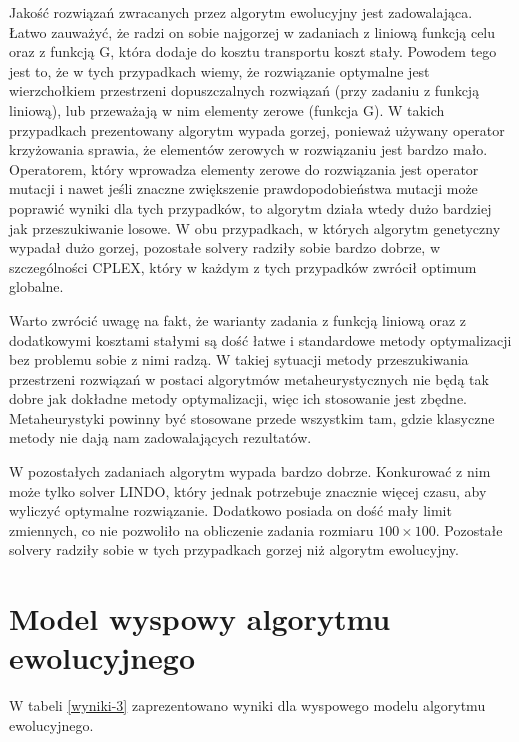 Jakość rozwiązań zwracanych przez algorytm ewolucyjny jest zadowalająca. Łatwo zauważyć, że radzi on sobie najgorzej w zadaniach z liniową funkcją celu 
oraz z funkcją G, która dodaje do kosztu transportu koszt stały. Powodem tego jest to, że w tych przypadkach wiemy, że rozwiązanie optymalne jest 
wierzchołkiem przestrzeni dopuszczalnych rozwiązań (przy zadaniu z funkcją liniową\cite{ALG-GEN-BOOK}), lub przeważają w nim elementy zerowe (funkcja G). 
W takich przypadkach prezentowany algorytm wypada gorzej, ponieważ używany operator krzyżowania sprawia, że elementów zerowych w rozwiązaniu 
jest bardzo mało. Operatorem, który wprowadza elementy zerowe do rozwiązania jest operator mutacji i nawet jeśli znaczne zwiększenie prawdopodobieństwa 
mutacji może poprawić wyniki dla tych przypadków, to algorytm działa wtedy dużo bardziej jak przeszukiwanie losowe. W obu przypadkach, w których 
algorytm genetyczny wypadał dużo gorzej, pozostałe solvery radziły sobie bardzo dobrze, w szczególności CPLEX, który w każdym z tych przypadków zwrócił 
optimum globalne. 

Warto zwrócić uwagę na fakt, że warianty zadania z funkcją liniową oraz z dodatkowymi kosztami stałymi są dość łatwe i 
standardowe metody optymalizacji bez problemu sobie z nimi radzą. W takiej sytuacji metody przeszukiwania przestrzeni rozwiązań w postaci algorytmów 
metaheurystycznych nie będą tak dobre jak dokładne metody optymalizacji, więc ich stosowanie jest zbędne. Metaheurystyki powinny być stosowane 
przede wszystkim tam, gdzie klasyczne metody nie dają nam zadowalających rezultatów.

W pozostałych zadaniach algorytm wypada bardzo dobrze. Konkurować z nim może tylko solver LINDO, który jednak potrzebuje znacznie więcej czasu, 
aby wyliczyć optymalne rozwiązanie. Dodatkowo posiada on dość mały limit zmiennych, co nie pozwoliło na obliczenie zadania rozmiaru $100 \times 100$. 
Pozostałe solvery radziły sobie w tych przypadkach gorzej niż algorytm ewolucyjny.

\newpage

\section{Model wyspowy algorytmu ewolucyjnego}

W tabeli \ref{wyniki-3} zaprezentowano wyniki dla wyspowego modelu algorytmu ewolucyjnego.

